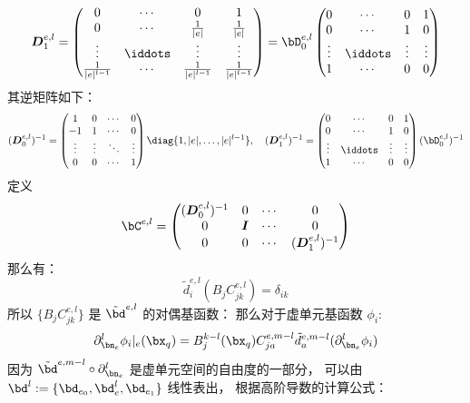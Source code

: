 $$
\boldsymbol{D}^{e, l}_1 = \begin{pmatrix}
    0 & \cdots & 0 & 1\\ 
    0 & \cdots & \frac{1}{|e|} & \frac{1}{|e|}\\
    \vdots & \iddots & \vdots & \vdots\\
    \frac{1}{|e|^{l-1}} & \cdots & \frac{1}{|e|^{l-1}} & \frac{1}{|e|^{l-1}}
\end{pmatrix}
= 
\bD^{e, l}_0 
\begin{pmatrix}
    0 & \cdots & 0 & 1\\ 
    0 & \cdots & 1 & 0\\
    \vdots & \iddots & \vdots & \vdots\\
    1 & \cdots & 0 & 0
\end{pmatrix}
$$
其逆矩阵如下：
$$
(\boldsymbol{D}^{e, l}_0)^{-1} = \begin{pmatrix}
    1 & 0 & \cdots & 0\\
    -1 & 1 & \cdots & 0\\
    \vdots & \vdots & \ddots & \vdots\\
    0 & 0 & \cdots & 1
\end{pmatrix}
\diag\{1, |e|, \ldots, |e|^{l-1}\}
, \quad
(\boldsymbol{D}^{e, l}_1)^{-1} = \begin{pmatrix}
    0 & \cdots & 0 & 1\\
    0 & \cdots & 1 & 0\\
    \vdots & \iddots & \vdots & \vdots\\
    1 & \cdots & 0 & 0
\end{pmatrix}
(\bD^{e, l}_0)^{-1}
$$
定义 
$$
\bC^{e, l} = \begin{pmatrix}
    (\boldsymbol{D}^{e, l}_0)^{-1} & 0 & \cdots & 0\\
    0 & \boldsymbol{I} & \cdots & 0\\
    0 & 0 & \cdots & (\boldsymbol{D}^{e, l}_1)^{-1} 
\end{pmatrix}
$$
那么有：
$$
\tilde{d}^{e, l}_i(B_jC_{jk}^{e, l}) = \delta_{ik}
$$
所以 $\{B_jC_{jk}^{e, l}\}$ 是 $\tilde{\bd}^{e, l}$ 的对偶基函数：
那么对于虚单元基函数 
$\phi_i$:
\begin{equation}
\label{eq:computeplnphi}
\partial^l_{\bn_e}\phi_i|_e(\bx_q) = B_j^{k-l}(\bx_q)C_{ja}^{e, m-l} 
\tilde{d}^{e, m-l}_{a}(\partial^{l}_{\bn_e}\phi_i)
\end{equation}
因为 $\tilde{\bd}^{e, m-l}\circ \partial_{\bn_e}^l$ 是虚单元空间的自由度的一部分，
可以由 $\bd^l := \{\bd_{e_0}, \bd_{e}^l, \bd_{e_1}\}$
线性表出，
根据高阶导数的计算公式：
